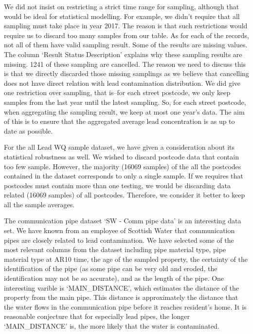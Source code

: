 \documentclass[11pt,twoside]{article}
\numberwithin{Theorem}{section}
\numberwithin{Definition}{section}
\numberwithin{Lemma}{section}
\numberwithin{Algorithm}{section}
\numberwithin{equation}{section}
\begin{document}
We did not insist on restricting a strict time range for sampling, although that would be ideal for statistical modelling. For example, we didn't require that all sampling must take place in year 2017. The reason is that such restrictions would require us to discard too many samples from our table.
As for each of the records, not all of them have valid sampling result. Some of the results are missing values. The column `Result Status Description' explains why these sampling results are missing. 1241 of these sampling are cancelled. The reason we need to discuss this is that we directly discarded those missing samplings as we believe that cancelling does not have direct relation with lead contamination distribution. We did give one restriction over sampling, that is--for each street postcode, we only keep samples from the last year until the latest sampling. So, for each street postcode, when aggregating the sampling result, we keep at most one year's data. The aim of this is to ensure that the aggregated average lead concentration is as up to date as possible.

For the all Lead WQ sample dataset, we have given a consideration about its statistical robustness as well. We wished to discard postcode data that contain too few sample. However, the majority (16069 samples) of the all the postcodes contained in the dataset corresponds to only a single sample. If we requires that postcodes must contain more than one testing, we would be discarding data related (16069 samples) of all postcodes. Therefore, we consider it better to keep all the sample averages.

The communication pipe dataset `SW - Comm pipe data' is an interesting data set. We have known from an employee of Scottish Water that communication pipes are closely related to lead contamination. We have selected some of the most relevant columns from the dataset including pipe material type, pipe material type at AR10 time, the age of the sampled property, the certainty of the identification of the pipe (as some pipe can be very old and eroded, the identification may not be so accurate), and as the length of the pipe. One interesting varible is `MAIN\_DISTANCE', which estimates the distance of the property from the main pipe. This distance is approximately the distance that the water flows in the communication pipe before it reaches resident's home. It is reasonable conjecture that for especially lead pipes, the longer `MAIN\_DISTANCE' is, the more likely that the water is contaminated.
\end{document}
